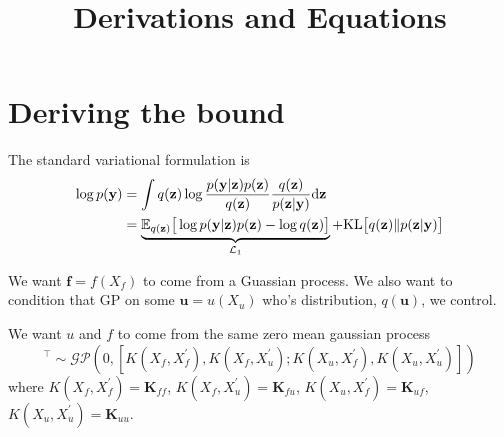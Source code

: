 \documentclass[12pt]{article}
\title{\textbf{Derivations and Equations}}
\date{}
\newcommand{\ub}{\mathbf{u}}
\newcommand{\zb}{\mathbf{z}}
\newcommand{\fb}{\mathbf{f}}
\newcommand{\yb}{\mathbf{y}}
\newcommand{\dd}{\mathrm{d}}
\newcommand{\Lo}{\mathcal{L}_1}
\newcommand{\Kff}{\mathbf{K}_{ff}}
\newcommand{\Kuu}{\mathbf{K}_{uu}}
\newcommand{\Kuf}{\mathbf{K}_{uf}}
\newcommand{\Kfu}{\mathbf{K}_{fu}}
\newcommand{\KL}{\mathrm{KL}}
\begin{document}
\maketitle


\section{Deriving the bound} %
\label{sec:derive_bound}
The standard variational formulation is
%
\begin{align}
    \log p(\yb) &= \int q(\zb)\log\frac{p(\yb|\zb)p(\zb)}{q(\zb)}\frac{q(\zb)}{p(\zb|\yb)} \dd\zb\notag\\
    &= \underbrace{\mathbb{E}_{q(\zb)}\big[ \log p(\yb|\zb)p(\zb) - \log q(\zb) \big]}_{\Lo} + \KL\big[ q(\zb)\Vert p(\zb|\yb) \big]\label{eq:logpy1}
\end{align}

We want $\fb = f(X_f)$ to come from a Guassian process. We also want to condition that GP on some $\ub=u(X_u)$ who's distribution, $q(\ub)$, we control.

We want $u$ and $f$ to come from the same zero mean gaussian process
%
\begin{equation}
    [f(X_f),u(X_u)]^\top \sim \mathcal{GP}(0,[K(X_f,X_f^\prime),K(X_f,X_u^\prime);K(X_u,X_f^\prime),K(X_u,X_u^\prime)])
\end{equation}
%
where $K(X_f,X_f^\prime) = \Kff$, $K(X_f,X_u^\prime) = \Kfu$, $ K(X_u,X_f^\prime) = \Kuf$, $K(X_u,X_u^\prime) = \Kuu$.
\end{document}
